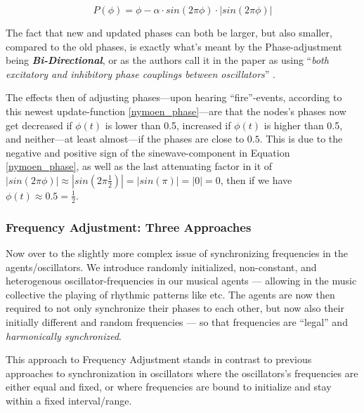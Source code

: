 			\begin{equation}
			\label{nymoen_phase}
				P(\phi) = \phi - \alpha \cdot sin(2\pi\phi) \cdot | sin(2\pi\phi) |
			\end{equation}
			
			The fact that new and updated phases can both be larger, but also smaller, compared to the old phases, is exactly what's meant by the Phase-adjustment being \textbf{\textit{Bi-Directional}}, or as the authors call it in the paper as using ``\textit{both excitatory and inhibitory phase couplings between oscillators}'' \cite{nymoen_synch}.
			
			The effects then of adjusting phases—upon hearing ``fire''-events, according to this newest update-function \eqref{nymoen_phase}—are that the nodes's phases now get decreased if $\phi(t)$ is lower than 0.5, increased if $\phi(t)$ is higher than 0.5, and neither—at least almost—if the phases are close to $0.5$. This is due to the negative and positive sign of the sinewave-component in Equation \eqref{nymoen_phase}, as well as the last attenuating factor in it of $| sin(2\pi\phi) | \approx | sin(2\pi \frac{1}{2}) | = | sin(\pi) | = | 0 | = 0$, then if we have $\phi(t) \approx 0.5 = \frac{1}{2}$.
		
		
		
		
		
		
		
		
		
		\subsubsection{Frequency Adjustment: Three Approaches}
		\label{subsubsec:freq_adj}
			Now over to the slightly more complex issue of synchronizing frequencies in the agents/oscillators. We introduce randomly initialized, non-constant, and heterogenous oscillator-frequencies in our musical agents — allowing in the music collective the playing of rhythmic patterns like  etc. The agents are now then required to not only synchronize their phases to each other, but now also their initially different and random frequencies — so that frequencies are ``legal'' and \textit{harmonically synchronized}.
			
			This approach to Frequency Adjustment stands in contrast to previous approaches to synchronization in oscillators  where the oscillators's frequencies are either equal and fixed, or where frequencies are bound to initialize and stay within a fixed interval/range.
			
